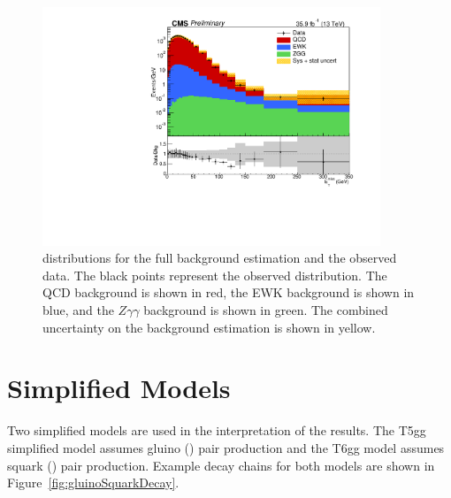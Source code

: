\begin{figure}[h]
\begin{center}
\includegraphics[width=0.9\textwidth]{Figures/Results/finalPlot.pdf}
\end{center}
\caption{\ETmiss distributions for the full background estimation and the observed data. The black points represent the observed \ETmiss distribution. 
The QCD background is shown in red, the EWK background
is shown in blue, and the $Z\gamma\gamma$ background is shown in green. 
The combined uncertainty on the background estimation is shown in yellow.
}
\label{fig:FinalPlot}
\end{figure}


\section{Simplified Models}
\label{sec:SimplifiedModels}

Two simplified models are used in the interpretation of the results. The T5gg simplified model assumes gluino (\gluino) pair production and the T6gg model assumes squark (\squark) pair production. Example decay chains for both models are shown in Figure~\ref{fig:gluinoSquarkDecay}.

